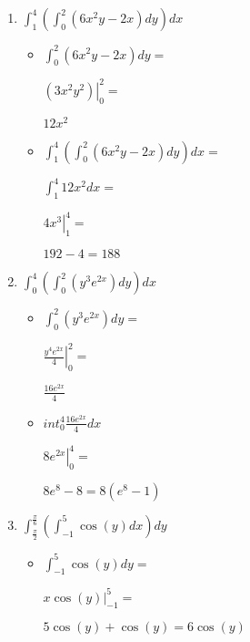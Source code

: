 \documentclass[../practica_08.tex]{subfiles}
\begin{document}
    \begin{enumerate}
        \item $ \int_1^4(\int_0^2 (6x^2y-2x) dy) dx $
        
            \begin{itemize}
                \item $\int_0^2 (6x^2y-2x) dy = $
                
                    $\left. (3x^2y^2) \right |_0^2 = $

                    $ 12x^2 $

                \item $ \int_1^4(\int_0^2 (6x^2y-2x) dy) dx =$
                
                    $ \int_1^4 12x^2 dx = $

                    $ \left. 4x^3 \right |_1^4 = $

                    $ 192 - 4 = 188 $

            \end{itemize}

        \item $ \int_0^4(\int_0^2 (y^3e^{2x}) dy) dx $
        
            \begin{itemize}
                \item $\int_0^2 (y^3e^{2x}) dy = $
                
                    $\left.  \frac{y^4e^{2x}}{4}  \right |_0^2 = $

                    $ \frac{16e^{2x}}{4} $

                \item $int_0^4 \frac{16e^{2x}}{4} dx $
                
                    $\left. 8e^{2x}  \right |_0^4 = $

                    $ 8e^8 - 8 = 8(e^8-1) $

            \end{itemize}

        \item $ \int_{\frac{\pi}{2}}^{\frac{\pi}{6}}(\int_{-1}^5 \cos(y) dx) dy $
        
            \begin{itemize}
                \item $\int_{-1}^5 \cos(y) dy = $
                
                    $ \left. x\cos(y) \right |_{-1}^5 = $

                    $ 5\cos(y) + \cos(y) =  6 \cos(y) $


\end{itemize}
\end{enumerate}
\end{document}
